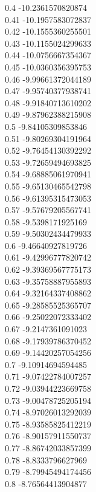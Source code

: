 {0.4	-10.2361570820874\\
0.41	-10.1957583072837\\
0.42	-10.1555360255501\\
0.43	-10.1155024299633\\
0.44	-10.0756667354367\\
0.45	-10.0360356395753\\
0.46	-9.99661372044189\\
0.47	-9.95740377938741\\
0.48	-9.91840713610202\\
0.49	-9.87962388215908\\
0.5	-9.84105309853846\\
0.51	-9.80269304191964\\
0.52	-9.76454130392292\\
0.53	-9.72659494693825\\
0.54	-9.68885061970941\\
0.55	-9.65130465542798\\
0.56	-9.61395315473053\\
0.57	-9.57679205567741\\
0.58	-9.5398171925169\\
0.59	-9.50302434479933\\
0.6	-9.46640927819726\\
0.61	-9.42996777820742\\
0.62	-9.39369567775173\\
0.63	-9.35758887955893\\
0.64	-9.32164337408862\\
0.65	-9.28585525365707\\
0.66	-9.25022072333402\\
0.67	-9.2147361091023\\
0.68	-9.17939786370452\\
0.69	-9.14420257054256\\
0.7	-9.10914694594485\\
0.71	-9.07422784007257\\
0.72	-9.03944223669758\\
0.73	-9.00478725205194\\
0.74	-8.97026013292039\\
0.75	-8.93585825412219\\
0.76	-8.90157911550737\\
0.77	-8.86742033857399\\
0.78	-8.8333796627969\\
0.79	-8.79945494174456\\
0.8	-8.76564413904877\\
}

